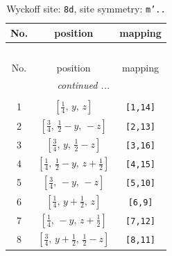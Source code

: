 \documentclass[fleqn,8pt]{jsarticle}
\begin{document}
\begin{longtable}{ccc}
\caption{Wyckoff site: {\tt 8d}, site symmetry: {\tt m'..}}
 \\
 \hline \hline
No. & position & mapping \\ \hline \endfirsthead

\multicolumn{2}{l}{\tablename\ \thetable{}} \\
 \hline \hline
No. & position & mapping \\ \hline \endhead

 \hline \hline
\multicolumn{2}{r}{\footnotesize\it continued ...} \\ \endfoot

 \hline \hline
\multicolumn{2}{r}{} \\ \endlastfoot

1 & $\left[ \frac{1}{4},\, y,\, z \right]$ & {\tt [1,14]} \\ \hline
2 & $\left[ \frac{3}{4},\, \frac{1}{2} - y,\, - z \right]$ & {\tt [2,13]} \\ \hline
3 & $\left[ \frac{3}{4},\, y,\, \frac{1}{2} - z \right]$ & {\tt [3,16]} \\ \hline
4 & $\left[ \frac{1}{4},\, \frac{1}{2} - y,\, z + \frac{1}{2} \right]$ & {\tt [4,15]} \\ \hline
5 & $\left[ \frac{3}{4},\, - y,\, - z \right]$ & {\tt [5,10]} \\ \hline
6 & $\left[ \frac{1}{4},\, y + \frac{1}{2},\, z \right]$ & {\tt [6,9]} \\ \hline
7 & $\left[ \frac{1}{4},\, - y,\, z + \frac{1}{2} \right]$ & {\tt [7,12]} \\ \hline
8 & $\left[ \frac{3}{4},\, y + \frac{1}{2},\, \frac{1}{2} - z \right]$ & {\tt [8,11]} \\
\end{longtable}
\renewcommand{\arraystretch}{1.2}
\end{document}
